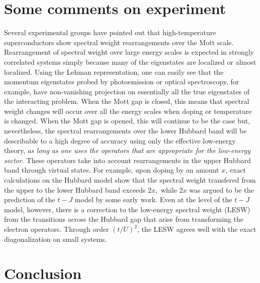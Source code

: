 \documentclass[floatfix,twocolumn,aps,prb,showpacs,superscriptaddress]{revtex4}
\begin{document}
\section{Some comments on experiment}


\label{Discussion}


Several experimental groups \cite{Experiments} have pointed out that
high-temperature superconductors show spectral weight rearrangements over
the Mott scale.\cite{wrobel}   Rearrangement of spectral weight over large
energy scales is expected in strongly correlated systems simply because
many of the eigenstates are localized or almost localized. Using the Lehman
representation, one can easily see that the momentum eigenstates probed by
photoemission or optical spectroscopy, for example, have non-vanishing
projection on essentially all the true eigenstates of the interacting
problem. When the Mott gap is closed, this means that spectral weight
changes will occur over all the energy scales when doping or temperature is
changed. When the Mott gap is opened, this will continue to be the case but,
nevertheless, the spectral rearrangements over the lower Hubbard band will
be describable to a high degree of accuracy using only the effective
low-energy theory, \textit{as long as one uses the operators that are
appropriate for the low-energy sector.} These operators take into account
rearrangements in the upper Hubbard band through virtual states. For
example, upon doping by an amount $x$, exact calculations on the Hubbard
model show that the spectral weight transfered from the upper to the lower
Hubbard band exceeds $2x,$ while $2x$ was argued to be the
prediction of the $t-J$ model by some early work.\cite{Meinders:1993}
Even at the level of the $t-J$ model, however, there is a correction\cite{Harris:1967,Eskes:1994}
to the low-energy spectral weight (LESW) from the transitions across
the Hubbard gap that arise from transforming the electron
operators. Through order $(t/U)^2$, the LESW agrees well with the
exact diagonalization on small systems. 




\section{Conclusion}


\label{Conclusions}
\end{document}

